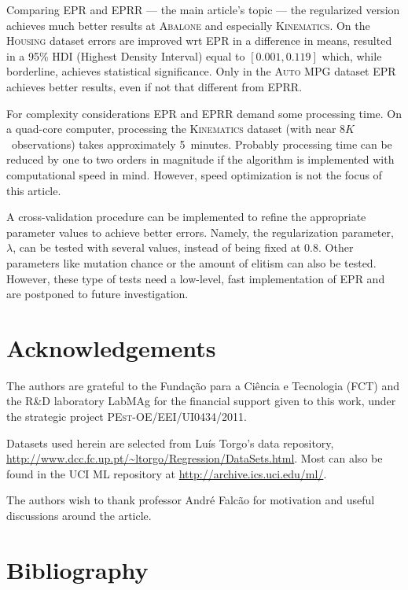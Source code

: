 \documentclass[preprint,authoryear,12pt]{elsarticle}
\begin{document}
Comparing \ac{EPR} and \ac{EPRR} --- the main article's topic --- the regularized version achieves much better results at \textsc{Abalone} and especially \textsc{Kinematics}. On the \textsc{Housing} dataset errors are improved  wrt \ac{EPR} in a difference in means, resulted in a 95\% HDI (Highest Density Interval) equal to $\left\lbrack 0.001, 0.119 \right\rbrack$ which, while borderline, achieves statistical significance. Only in the \textsc{Auto MPG} dataset \ac{EPR} achieves better results, even if not that different from \ac{EPRR}.

For complexity considerations \ac{EPR} and \ac{EPRR} demand some processing time. On a quad-core computer, processing the \textsc{Kinematics} dataset (with near $8K$~observations) takes approximately 5~minutes. Probably processing time can be reduced by one to two orders in magnitude if the algorithm is implemented with computational speed in mind. However, speed optimization is not the focus of this article.

A cross-validation procedure can be implemented to refine the appropriate parameter values to achieve better errors. Namely, the regularization parameter, $\lambda$, can be tested with several values, instead of being fixed at $0.8$. Other parameters like mutation chance or the amount of elitism can also be tested. However, these type of tests need a low-level, fast implementation of \ac{EPR} and are postponed to future investigation.

\section*{Acknowledgements}

The authors are grateful to the Fundação para a Ciência e Tecnologia (FCT) and the  R\&D laboratory LabMAg for the financial support given to this work, under the strategic project \textsc{PEst-OE/EEI/UI0434/2011}.

Datasets used herein are selected from Luís Torgo's data repository, \url{http://www.dcc.fc.up.pt/~ltorgo/Regression/DataSets.html}. Most can also be found in the UCI ML repository at \url{http://archive.ics.uci.edu/ml/}.

The authors wish to thank professor André Falcão for motivation and useful discussions around the article.

\section*{Bibliography}



    
\end{document}
